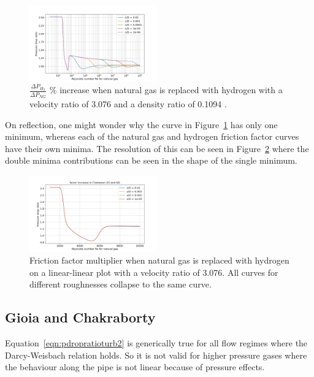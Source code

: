 \documentclass[5p]{elsarticle} %
\begin{document}
\begin{figure}[htb]
\centering
\includegraphics[width=0.49\textwidth]{p2_h2_ratio.png}
\caption{$\frac{\Delta P_{H_2}}{\Delta P_{NG}}$ \% increase when natural gas is replaced with hydrogen with a velocity ratio of 3.076 and a density ratio of 0.1094 .}
\label{fig:p2_h2ng}
\end{figure}

On reflection, one might wonder why the curve in Figure~\ref{fig:p2_h2ng} has only one minimum, whereas each of the natural gas and hydrogen friction factor curves have their own minima. The resolution of this can be seen in Figure~\ref{fig:h2ng_enlarge} where the double minima contributions can be seen in the shape of the single minimum. 

\begin{figure}[htb]
\centering
\includegraphics[width=0.49\textwidth]{h2_ratio_enlarge_lin.png}
\caption{Friction factor multiplier when natural gas is replaced with hydrogen on a linear-linear plot with a velocity ratio of 3.076. All curves for different roughnesses collapse to the same curve.}
\label{fig:h2ng_enlarge}
\end{figure}

\subsection{Gioia and Chakraborty}
\label{gioia}

Equation~\eqref{eqn:pdropratioturb2} is generically true for all flow regimes where the Darcy-Weisbach relation holds. So it is not valid for higher pressure gases where the behaviour along the pipe is not linear because of pressure effects.
\end{document}
